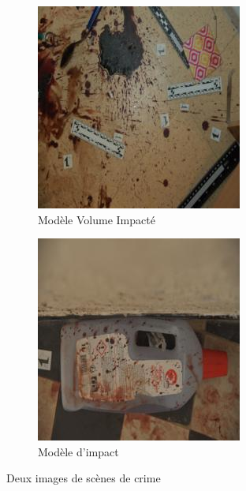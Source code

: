 \documentclass[a4paper]{article}
\begin{document}
\begin{figure}[ht]
    \centering
    \begin{subfigure}{0.40\linewidth}
        \centering
        \includegraphics[width=\linewidth]{../asset/data_real/12.jpg}
        \caption{Modèle Volume Impacté}
    \end{subfigure}
    \begin{subfigure}{0.40\linewidth}
        \centering
        \includegraphics[width=\linewidth]{../asset/data_real/15.jpg}
        \caption{Modèle d'impact}
    \end{subfigure}
    \caption{Deux images de scènes de crime}
    \label{fig: reals images}
\end{figure}
\end{document}
